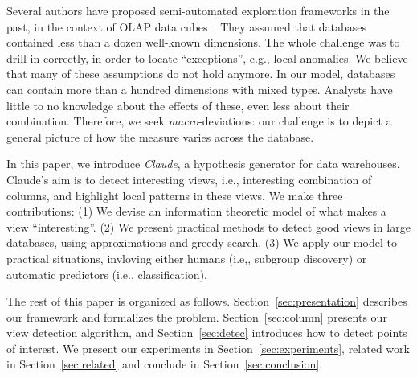 Several authors have proposed semi-automated exploration frameworks in the
past, in the context of OLAP data cubes~\cite{sarawagi1998discovery,
imielinski2002cubegrades}. They assumed that databases contained less than a
dozen well-known dimensions.  The whole challenge was to drill-in correctly, in
order to locate ``exceptions'', e.g., local anomalies. We believe that many of
these assumptions do not hold anymore. In our model, databases can contain more
than a hundred dimensions with mixed types. Analysts have little to no
knowledge about the effects of these, even less about their combination.
Therefore, we seek \emph{macro}-deviations: our challenge is to depict a
general picture of how the measure varies across the database.

In this paper, we introduce \textit{Claude}, a hypothesis generator for data
warehouses. Claude's aim is to detect interesting views, i.e., interesting
combination of columns, and highlight local patterns in these views. We make
three contributions: (1) We devise an information theoretic model of what makes
a view ``interesting''. (2) We present practical methods to detect good views
in large databases, using approximations and greedy search. (3) We apply our
model to practical situations, invloving either humans (i.e,, subgroup
discovery) or automatic predictors (i.e., classification).

The rest of this paper is organized as follows. Section~\ref{sec:presentation}
describes our framework and formalizes the problem. Section~\ref{sec:column}
presents our view detection algorithm, and Section~\ref{sec:detec}
introduces how to detect points of interest. We present our experiments in
Section~\ref{sec:experiments}, related work in Section~\ref{sec:related} and
conclude in Section~\ref{sec:conclusion}.



